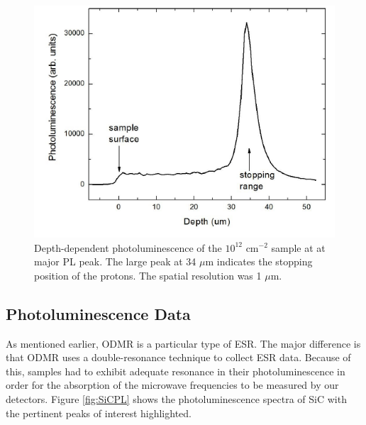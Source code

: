 \documentclass[oneside, astronomy, noacknowlegments]{BYUPhys}
\begin{document}
\begin{figure}
    \centerline{\includegraphics{srim_fig}}
    \caption[SiC Depth-Dependent Photoluminescence]{\label{fig:SiCDepth}
     Depth-dependent photoluminescence of the $10^{12}$ $\text{cm}^{−2}$ sample at at major PL peak. The large peak at 34 $\mu$m indicates the stopping position of the protons. The spatial resolution was 1 $\mu$m.}
 \end{figure}

\subsection{Photoluminescence Data}

As mentioned earlier, ODMR is a particular type of ESR. The major difference is that ODMR uses a double-resonance technique to collect ESR data. Because of this, samples had to exhibit adequate resonance in their photoluminescence in order for the absorption of the microwave frequencies to be measured by our detectors. Figure \ref{fig:SiCPL} shows the photoluminescence spectra of SiC with the pertinent peaks of interest highlighted.
\end{document}
